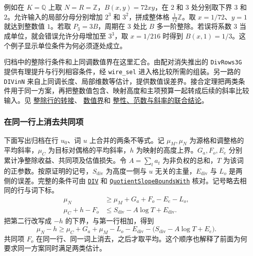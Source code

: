 \documentclass[UTF8,fontset=none,a4paper,11pt]{ctexart}
\theoremstyle{definition}
\newcommand{\src}[3]{\href{https://github.com/leanprover-community/riemann-hypothesis/blob/23aebbb302010b292314d406aa97f7901d698634/src/#1.lean\#L#2}{#3}}
\begin{document}
例如在 $K=\mathbb Q$ 上取 $N=R=\mathbb Z$，$B(x,y)=72xy$，在 $2$ 和 $3$ 处分别取下界 $3$ 和 $2$。允许输入的局部分母分别增加 $2^3$ 和 $3^2$，拼成整体格 $\tfrac1{72}\mathbb Z$。取 $x=1/72$、$y=1$ 就达到整数值 $1$。若取 $P_3=3B$，周期在 $3$ 处比 $B$ 多一阶整除。若误将系数 $3$ 当成单位，就会错误允许分母增加至 $3^3$，取 $x=1/216$ 时得到 $B(x,1)=1/3$。这个例子显示单位条件为何必须逐处成立。

归档中的整除行条件和上同调数值界在这里汇合。由配对消失推出的 \texttt{DivRows3G} 提供有理提升与行列相容条件，经 \texttt{wire\_sel} 进入格比较所需的组装。另一路的 \texttt{DIVinN} 来自上同调长度、局部维数等估计，提供数值误差界。接合定理把两类条件用于同一方案，再把整数值包含、映射高度和主项预算一起转成后续的斜率比较输入。见
\src{Development/AutomorphicArithmetic/ThetaCorrespondence/ThetaPairLifts/ThirdPlaceSeries/WireSel}{20}{整除行的转接}、
\src{Development/AutomorphicArithmetic/CharacterBoxes/DivinNOfHypV}{117}{数值界}和
\src{Formalism/LocalToGlobal/Divisibility/ConstantGeTwentyEight}{185}{整性、范数与斜率的联合结论}。

\subsubsection{在同一行上消去共同项}
下面写出归档在行 $u_0$、词 $u$ 上合并的两条不等式。记 $\mu_M,\mu_N$ 为源格和调整格的平均斜率，$\mu_C$ 为目标对偶格的平均斜率，$h$ 为映射的高度上界。$G_a,F_o,E_e$ 分别累计净整除收益、共同项及估值损失。令 $A=\sum_t a_t$ 为非负权的总和，$T$ 为该词的正参数。按原证明的记号，$S_{\mathrm{div}}$ 为高度一侧与 $u$ 无关的主量，$E_{\mathrm{div}}$ 与 $L_o$ 是两侧的误差。完整的条件可由
\src{Formalism/RankGapBounds/MeanBoundSecondForm}{118}{\texttt{DIV}}
和
\src{Formalism/SizeWindowBrackets/QuotientSlopeBoundsWith}{19}{\texttt{QuotientSlopeBoundsWith}}
核对。记号略去相同的行与词下标。
\begin{align}
 \mu_N&\ge\mu_M+G_a+F_o-E_e-L_o,\label{eq:slope-lo}\\
 \mu_C+h-F_o&\le S_{\mathrm{div}}-A\log T+E_{\mathrm{div}}.\label{eq:slope-hi}
\end{align}
把第二行改写成 $-h$ 的下界，与第一行相加，得到
\begin{equation}\label{eq:slope-cancel}
 \mu_N-h\ge
 \mu_C+G_a+\mu_M-L_o-E_{\mathrm{div}}
       -\bigl(S_{\mathrm{div}}-A\log T+E_e\bigr).
\end{equation}
共同项 $F_o$ 在同一行、同一词上消去，之后才取平均。这个顺序也解释了前面为何要求同一方案同时满足两类估计。
\end{document}

